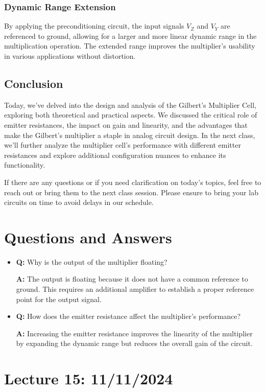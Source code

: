 \subsubsection{Dynamic Range Extension}
By applying the preconditioning circuit, the input signals $V_Z$ and $V_Y$ are referenced to ground, allowing for a larger and more linear dynamic range in the multiplication operation. The extended range improves the multiplier's usability in various applications without distortion.

\subsection{Conclusion}
Today, we've delved into the design and analysis of the Gilbert's Multiplier Cell, exploring both theoretical and practical aspects. We discussed the critical role of emitter resistances, the impact on gain and linearity, and the advantages that make the Gilbert's multiplier a staple in analog circuit design. In the next class, we'll further analyze the multiplier cell's performance with different emitter resistances and explore additional configuration nuances to enhance its functionality.

If there are any questions or if you need clarification on today's topics, feel free to reach out or bring them to the next class session. Please ensure to bring your lab circuits on time to avoid delays in our schedule.

\section*{Questions and Answers}
\begin{itemize}
    \item \textbf{Q:} Why is the output of the multiplier floating?
    
    \textbf{A:} The output is floating because it does not have a common reference to ground. This requires an additional amplifier to establish a proper reference point for the output signal.
    
    \item \textbf{Q:} How does the emitter resistance affect the multiplier's performance?
    
    \textbf{A:} Increasing the emitter resistance improves the linearity of the multiplier by expanding the dynamic range but reduces the overall gain of the circuit.
\end{itemize}
\newpage
\section{Lecture 15: 11/11/2024}

